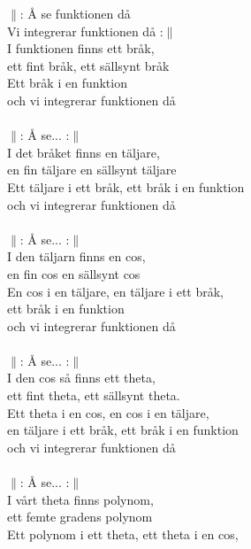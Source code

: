 \documentclass[a6paper, 10pt, twoside]{article}
\begin{document}

\begin{center}
\end{center}
\begin{lyrics}
$\|$: Å se funktionen då \\
Vi integrerar funktionen då :$\|$ \\
I funktionen finns ett bråk, \\
ett fint bråk, ett sällsynt bråk\\ 
Ett bråk i en funktion \\
och vi integrerar funktionen då \\
\vspace{7pt}\\
$\|$: Å se... :$\|$ \\
I det bråket finns en täljare, \\
en fin täljare en sällsynt täljare\\
Ett täljare i ett bråk, ett bråk i en funktion \\
och vi integrerar funktionen då \\
\vspace{7pt}\\
$\|$: Å se... :$\|$ \\
I den täljarn finns en cos, \\ 
en fin cos en sällsynt cos \\
En cos i en täljare, en täljare i ett bråk, \\
ett bråk i en funktion \\
och vi integrerar funktionen då \\
\vspace{7pt}\\
$\|$: Å se... :$\|$ \\
I den cos så finns ett theta, \\
ett fint theta, ett sällsynt theta. \\
Ett theta i en cos, en cos i en täljare, \\
en täljare i ett bråk, ett bråk i en funktion \\
och vi integrerar funktionen då\\
\vspace{7pt}\\
$\|$: Å se... :$\|$ \\
I vårt theta finns polynom, \\
ett femte gradens polynom \\
Ett polynom i ett theta, ett theta i en cos, \\

\end{lyrics}
\end{document}
